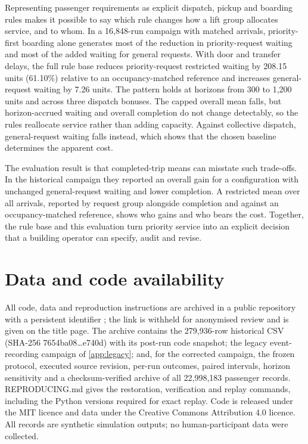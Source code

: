 Representing passenger requirements as explicit dispatch, pickup and boarding rules makes it possible to say which rule changes how a lift group allocates service, and to whom. In a 16,848-run campaign with matched arrivals, priority-first boarding alone generates most of the reduction in priority-request waiting and most of the added waiting for general requests. With door and transfer delays, the full rule base reduces priority-request restricted waiting by 208.15 units (61.10\%) relative to an occupancy-matched reference and increases general-request waiting by 7.26 units. The pattern holds at horizons from 300 to 1,200 units and across three dispatch bonuses. The capped overall mean falls, but horizon-accrued waiting and overall completion do not change detectably, so the rules reallocate service rather than adding capacity. Against collective dispatch, general-request waiting falls instead, which shows that the chosen baseline determines the apparent cost.

The evaluation result is that completed-trip means can misstate such trade-offs. In the historical campaign they reported an overall gain for a configuration with unchanged general-request waiting and lower completion. A restricted mean over all arrivals, reported by request group alongside completion and against an occupancy-matched reference, shows who gains and who bears the cost. Together, the rule base and this evaluation turn priority service into an explicit decision that a building operator can specify, audit and revise.

\section{Data and code availability}\label{data-and-code-availability}

All code, data and reproduction instructions are archived in a public repository with a persistent identifier \cite{dataset}; the link is withheld for anonymised review and is given on the title page. The archive contains the 279,936-row historical CSV (SHA-256 7654ba08\ldots e740d) with its post-run code snapshot; the legacy event-recording campaign of \ref{app:legacy}; and, for the corrected campaign, the frozen protocol, executed source revision, per-run outcomes, paired intervals, horizon sensitivity and a checksum-verified archive of all 22,998,183 passenger records. REPRODUCING.md gives the restoration, verification and replay commands, including the Python versions required for exact replay. Code is released under the MIT licence and data under the Creative Commons Attribution 4.0 licence. All records are synthetic simulation outputs; no human-participant data were collected.

